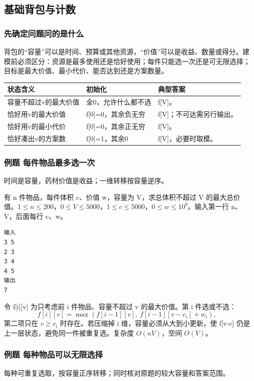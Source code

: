 \subsection{基础背包与计数}
\subsubsection{先确定问题问的是什么}
背包的“容量”可以是时间、预算或其他资源，“价值”可以是收益、数量或得分。建模前必须区分：资源是最多使用还是恰好使用；每件只能选一次还是可无限选择；目标是最大价值、最小代价、能否达到还是方案数量。

\begin{longtable}{P{3.4cm}P{5cm}P{5.8cm}}
\toprule 状态含义 & 初始化 & 典型答案\\\midrule\endhead
容量不超过v的最大价值 & 全0，允许什么都不选 & f[V]。\\
恰好用v的最大价值 & f[0]=0，其余负无穷 & f[V]；不可达需另行输出。\\
恰好用v的最小代价 & f[0]=0，其余正无穷 & f[V]。\\
恰好凑出v的方案数 & f[0]=1，其余0 & f[V]，必要时取模。\\
\bottomrule
\end{longtable}

\subsubsection{例题 每件物品最多选一次}
时间是容量，药材价值是收益；一维转移按容量逆序。

有 n 件物品，每件体积 c、价值 w，容量为 V，求总体积不超过 V 的最大总价值。$1\le n\le200$，$0\le V\le5000$，$1\le c\le5000$，$0\le w\le10^9$。输入第一行 n、V，后面每行 c、w。
\begin{verbatim}
输入
3 5
2 3
3 4
4 5
输出
7
\end{verbatim}
令 f[i][v] 为只考虑前 i 件物品、容量不超过 v 的最大价值。第 i 件选或不选：
\[f[i][v]=\max(f[i-1][v],\ f[i-1][v-c_i]+w_i),\]
第二项只在 $v\ge c_i$ 时存在。若压缩掉 i 维，容量必须从大到小更新，使 f[v-c] 仍是上一层状态，避免同一件被重复选。复杂度 $O(nV)$，空间 $O(V)$。

\subsubsection{例题 每种物品可以无限选择}
每种可重复选取，按容量正序转移；同时核对原题的较大容量和答案范围。

